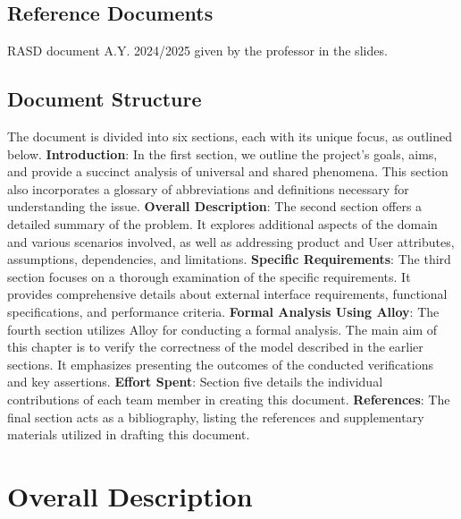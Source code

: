 \documentclass{article}
\begin{document}
\subsection{Reference Documents}
RASD document A.Y. 2024/2025 given by the professor in the slides.

\subsection{Document Structure}
The document is divided into six sections, each with its unique focus, as outlined below.\newline \newline
\textbf{Introduction}: In the first section, we outline the project's goals, aims, and provide a succinct analysis of universal and shared phenomena. This section also incorporates a glossary of abbreviations and definitions necessary for understanding the issue.\newline \newline
\textbf{Overall Description}: The second section offers a detailed summary of the problem. It explores additional aspects of the domain and various scenarios involved, as well as addressing product and User attributes, assumptions, dependencies, and limitations.\newline \newline
\textbf{Specific Requirements}: The third section focuses on a thorough examination of the specific requirements. It provides comprehensive details about external interface requirements, functional specifications, and performance criteria.\newline \newline
\textbf{Formal Analysis Using Alloy}: The fourth section utilizes Alloy for conducting a formal analysis. The main aim of this chapter is to verify the correctness of the model described in the earlier sections. It emphasizes presenting the outcomes of the conducted verifications and key assertions.\newline \newline
\textbf{Effort Spent}: Section five details the individual contributions of each team member in creating this document.\newline \newline
\textbf{References}: The final section acts as a bibliography, listing the references and supplementary materials utilized in drafting this document.
\section{Overall Description}
\end{document}
